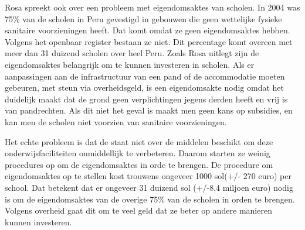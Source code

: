 Rosa spreekt ook over een probleem met eigendomsaktes van scholen. In 2004 was 75\% van de scholen in Peru gevestigd in gebouwen die geen wettelijke fysieke sanitaire voorzieningen heeft. Dat komt omdat ze geen eigendomsaktes hebben. Volgens het openbaar register bestaan ze niet. Dit percentage komt overeen met meer dan 31 duizend scholen over heel Peru. Zoals Rosa uitlegt zijn de eigendomsaktes belangrijk om te kunnen investeren in scholen. Als er aanpassingen aan de infrastructuur van een pand of de accommodatie moeten gebeuren, met steun via overheidsgeld, is een eigendomsakte nodig omdat het duidelijk maakt dat de grond geen verplichtingen jegens derden heeft en vrij is van pandrechten. Als dit niet het geval is maakt men geen kans op subsidies, en kan men de scholen niet voorzien van sanitaire voorzieningen.

Het echte probleem is dat de staat niet over de middelen beschikt om deze onderwijsfaciliteiten onmiddellijk te verbeteren. Daarom starten ze weinig procedures op om de eigendomsaktes in orde te brengen. De procedure om eigendomsaktes op te stellen kost trouwens ongeveer 1000 sol(+/- 270 euro) per school. Dat betekent dat er ongeveer 31 duizend sol (+/-8,4 miljoen euro) nodig is om de eigendomsaktes van de overige 75\% van de scholen in orden te brengen. Volgens overheid gaat dit om te veel geld dat ze beter op andere manieren kunnen investeren. \autocite{larepublica2004}
